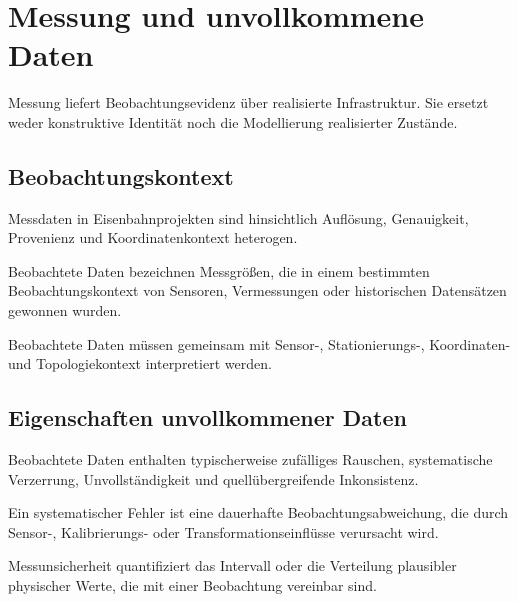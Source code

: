 \chapter{Messung und unvollkommene Daten}
\label{chap:measurement-and-imperfect-data}

Messung liefert Beobachtungsevidenz über realisierte Infrastruktur. Sie ersetzt
weder konstruktive Identität noch die Modellierung realisierter Zustände.

\section{Beobachtungskontext}
Messdaten in Eisenbahnprojekten sind hinsichtlich Auflösung, Genauigkeit,
Provenienz und Koordinatenkontext heterogen.
\begin{definition}
Beobachtete Daten bezeichnen Messgrößen, die in einem bestimmten
Beobachtungskontext von Sensoren, Vermessungen oder historischen Datensätzen
gewonnen wurden.
\end{definition}
\begin{principle}
Beobachtete Daten müssen gemeinsam mit Sensor-, Stationierungs-, Koordinaten-
und Topologiekontext interpretiert werden.
\end{principle}

\section{Eigenschaften unvollkommener Daten}
Beobachtete Daten enthalten typischerweise zufälliges Rauschen, systematische
Verzerrung, Unvollständigkeit und quellübergreifende Inkonsistenz.
\begin{definition}
Ein systematischer Fehler ist eine dauerhafte Beobachtungsabweichung, die
durch Sensor-, Kalibrierungs- oder Transformationseinflüsse verursacht wird.
\end{definition}
\begin{definition}[Messunsicherheit]
Messunsicherheit quantifiziert das Intervall oder die Verteilung plausibler
physischer Werte, die mit einer Beobachtung vereinbar sind.
\end{definition}

